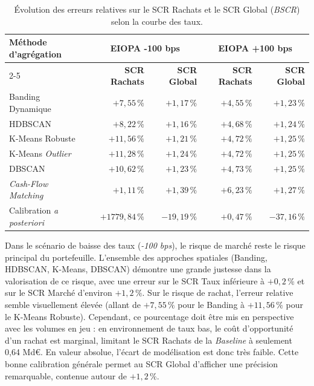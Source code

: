 \begin{table}[H]
    \centering
    \renewcommand{\arraystretch}{1.4}
    \begin{tabular}{|l|r|r||r|r|}
        \hline
        \multirow{2}{*}{\textbf{Méthode d'agrégation}} & \multicolumn{2}{c||}{\textbf{EIOPA -100 bps}} & \multicolumn{2}{c|}{\textbf{EIOPA +100 bps}} \\
        \cline{2-5}
        & \textbf{SCR Rachats} & \textbf{SCR Global} & \textbf{SCR Rachats} & \textbf{SCR Global} \\
        \hline
        Banding Dynamique & $+7{,}55\,\%$ & $+1{,}17\,\%$ & $+4{,}55\,\%$ & $+1{,}23\,\%$ \\
        HDBSCAN & $+8{,}22\,\%$ & $+1{,}16\,\%$ & $+4{,}68\,\%$ & $+1{,}24\,\%$ \\
        K-Means Robuste & $+11{,}56\,\%$ & $+1{,}21\,\%$ & $+4{,}72\,\%$ & $+1{,}25\,\%$ \\
        K-Means \textit{Outlier} & $+11{,}28\,\%$ & $+1{,}24\,\%$ & $+4{,}72\,\%$ & $+1{,}25\,\%$ \\
        DBSCAN & $+10{,}62\,\%$ & $+1{,}23\,\%$ & $+4{,}73\,\%$ & $+1{,}25\,\%$ \\
        \textit{Cash-Flow Matching} & $+1{,}11\,\%$ & $+1{,}39\,\%$ & $+6{,}23\,\%$ & $+1{,}27\,\%$ \\
        Calibration \textit{a posteriori} & $+1779{,}84\,\%$ & $-19{,}19\,\%$ & $+0{,}47\,\%$ & $-37{,}16\,\%$ \\
        \hline
    \end{tabular}
    \caption{Évolution des erreurs relatives sur le SCR Rachats et le SCR Global (\textit{BSCR}) selon la courbe des taux.}
    \label{tab:resultats_vie_scr_sensibilites}
\end{table}

Dans le scénario de baisse des taux (\textit{-100 bps}), le risque de marché reste le risque principal du portefeuille. L'ensemble des approches spatiales (Banding, HDBSCAN, K-Means, DBSCAN) démontre une grande justesse dans la valorisation de ce risque, avec une erreur sur le SCR Taux inférieure à $+0{,}2\,\%$ et sur le SCR Marché d'environ $+1{,}2\,\%$. Sur le risque de rachat, l'erreur relative semble visuellement élevée (allant de $+7{,}55\,\%$ pour le Banding à $+11{,}56\,\%$ pour le K-Means Robuste). Cependant, ce pourcentage doit être mis en perspective avec les volumes en jeu : en environnement de taux bas, le coût d'opportunité d'un rachat est marginal, limitant le SCR Rachats de la \textit{Baseline} à seulement 0,64 Md€. En valeur absolue, l'écart de modélisation est donc très faible. Cette bonne calibration générale permet au SCR Global d'afficher une précision remarquable, contenue autour de $+1{,}2\,\%$.

